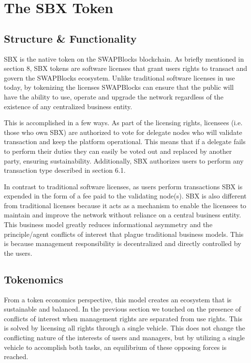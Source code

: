 \documentclass[12pt]{article}
\begin{document}
\section{The SBX Token}

\subsection{Structure \& Functionality}
SBX is the native token on the SWAPBlocks blockchain. As briefly mentioned in section 8, SBX tokens are software licenses that grant users rights to transact and govern the SWAPBlocks ecosystem. Unlike traditional software licenses in use today, by tokenizing the licenses SWAPBlocks can ensure that the public will have the ability to use, operate and upgrade the network regardless of the existence of any centralized business entity.

This is accomplished in a few ways. As part of the licensing rights, licensees (i.e. those who own SBX) are authorized to vote for delegate nodes who will validate transaction and keep the platform operational. This means that if a delegate fails to perform their duties they can easily be voted out and replaced by another party, ensuring sustainability. Additionally, SBX authorizes users to perform any transaction type described in section 6.1.

In contrast to traditional software licenses, as users perform transactions SBX is expended in the form of a fee paid to the validating node(s). SBX is also different from traditional licenses because it acts as a mechanism to enable the licensees to maintain and improve the network without reliance on a central business entity. This business model greatly reduces informational asymmetry and the principle/agent conflicts of interest that plague traditional business models. This is because management responsibility is decentralized and directly controlled by the users.


\subsection{Tokenomics}
From a token economics perspective, this model creates an ecosystem that is sustainable and balanced. In the previous section we touched on the presence of conflicts of interest when management rights are separated from use rights. This is solved by licensing all rights through a single vehicle. This does not change the conflicting nature of the interests of users and managers, but by utilizing a single vehicle to accomplish both tasks, an equilibrium of these opposing forces is reached.
\end{document}
